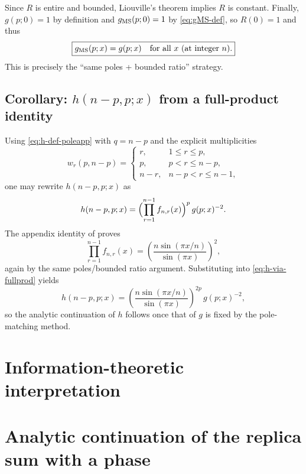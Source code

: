 \documentclass[11pt]{article}
\begin{document}
  Since $R$ is entire and bounded, Liouville's theorem implies $R$ is constant.
  Finally, $g(p;0)=1$ by definition and $g_{\rm MS}(p;0)=1$ by \eqref{eq:gMS-def},
  so $R(0)=1$ and thus
  \begin{equation}
    \boxed{g_{\rm MS}(p;x)=g(p;x)\quad \text{for all }x\ \text{(at integer }n\text{).}}
  \end{equation}
  This is precisely the ``same poles + bounded ratio'' strategy.

  \subsection*{Corollary: $h(n-p,p;x)$ from a full-product identity}

  Using \eqref{eq:h-def-poleapp} with $q=n-p$ and the explicit multiplicities
  \begin{equation}
    w_{r}(p,n-p)=
    \begin{cases}
      r,   & 1\le r\le p,  \\
      p,   & p<r\le n-p,   \\
      n-r, & n-p<r\le n-1,
    \end{cases}
  \end{equation}
  one may rewrite $h(n-p,p;x)$ as
  \begin{equation}
    h(n-p,p;x)=\Bigl(\prod_{r=1}^{n-1}f_{n,r}(x)\Bigr)^{p}\,g(p;x)^{-2}. \label{eq:h-via-fullprod}
  \end{equation}
  The appendix identity of 
  \cite{Lashkari_2016}
  proves
  \begin{equation}
    \prod_{r=1}^{n-1}f_{n,r}(x)=\left(\frac{n\sin(\pi x/n)}{\sin(\pi x)}\right)^{2}
    ,
  \end{equation}
  again by the same poles/bounded ratio argument. Substituting into \eqref{eq:h-via-fullprod}
  yields
  \begin{equation}
    \boxed{ h(n-p,p;x) = \left(\frac{n\sin(\pi x/n)}{\sin(\pi x)}\right)^{2p}\,g(p;x)^{-2}, }
  \end{equation}
  so the analytic continuation of $h$ follows once that of $g$ is fixed by the
  pole-matching method.

  \section{Information-theoretic interpretation}

  \appendix
\section{Analytic continuation of the replica sum with a phase}
\label{app:analytic-continuation}
\end{document}

